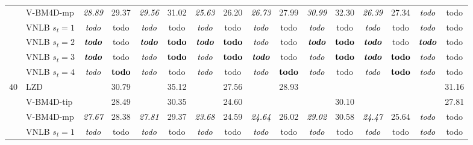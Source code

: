 \documentclass[10pt, journal, twocolumn, final, a4paper]{IEEEtran}
\newcommand{\bsic}[1]{\textcolor{black}{\textit{#1}}}
\newcommand{\Bsic}[1]{\textcolor{black}{\textbf{\textit{#1}}}}
\newcommand{\Best}[1]{\textbf{\textcolor{black}{#1}}}
\begin{document}
\begin{table}[htp!]
\begin{center}
{\begin{tabular}{ c | l |c c | c c | c c | c c | c c | c c | c c}
			                      & V-BM4D-mp            & \bsic{28.89} &       29.37  & \bsic{29.56} &       31.02   & \bsic{25.63} &       26.20   & \bsic{26.73} &       27.99  & \bsic{30.99} &       32.30   & \bsic{26.39} &       27.34  & \bsic{todo } &       todo   \\
			                      & VNLB   $s_t = 1$     & \bsic{todo } &       todo   & \bsic{todo } &       todo    & \bsic{todo } &       todo    & \bsic{todo } &       todo   & \bsic{todo } &       todo    & \bsic{todo } &       todo   & \bsic{todo } &       todo   \\
			                      & VNLB   $s_t = 2$     & \Bsic{todo } &       todo   & \Bsic{todo } & \Best{todo }  & \Bsic{todo } & \Best{todo }  & \bsic{todo } &       todo   & \Bsic{todo } & \Best{todo }  & \Bsic{todo } &       todo   & \Bsic{todo } &       todo   \\
			                      & VNLB   $s_t = 3$     & \Bsic{todo } &       todo   & \bsic{todo } & \Best{todo }  & \bsic{todo } & \Best{todo }  & \Bsic{todo } &       todo   & \bsic{todo } & \Best{todo }  & \Bsic{todo } & \Best{todo } & \bsic{todo } &       todo   \\
			                      & VNLB   $s_t = 4$     & \bsic{todo } & \Best{todo } & \bsic{todo } &       todo    & \bsic{todo } &       todo    & \bsic{todo } & \Best{todo } & \bsic{todo } &       todo    & \bsic{todo } & \Best{todo } & \bsic{todo } &       todo   \\\hline
%
			\multirow{1}{*}{$40$}
			                      & LZD                  & \bsic{     } &       30.79  & \bsic{     } &       35.12   & \bsic{     } &       27.56   & \bsic{     } &       28.93  &              &               &              &              & \bsic{     } &       31.16  \\
			                      & V-BM4D-tip           & \bsic{     } &       28.49  & \bsic{     } &       30.35   & \bsic{     } &       24.60   &              &              &              &       30.10   &              &              & \bsic{     } &       27.81  \\
			                      & V-BM4D-mp            & \bsic{27.67} &       28.38  & \bsic{27.81} &       29.37   & \bsic{23.68} &       24.59   & \bsic{24.64} &       26.02  & \bsic{29.02} &       30.58   & \bsic{24.47} &       25.64  & \bsic{todo } &       todo   \\
			                      & VNLB   $s_t = 1$     & \bsic{todo } &       todo   & \bsic{todo } &       todo    & \bsic{todo } &       todo    & \bsic{todo } &       todo   & \bsic{todo } &       todo    & \bsic{todo } &       todo   & \bsic{todo } &       todo   \\

\end{tabular}}
\end{center}
\end{table}
\end{document}
